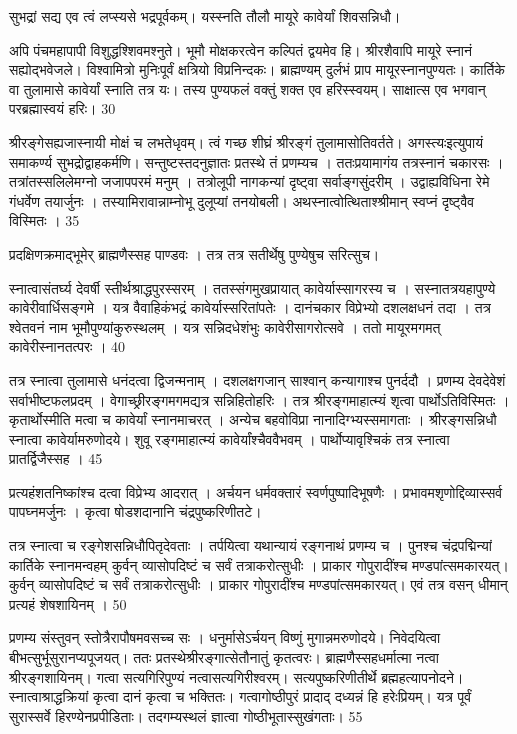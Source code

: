 सुभद्रां सद्य एव त्वं लप्स्यसे भद्रपूर्वकम्।
यस्स्नति तौलौ मायूरे कावेर्यां शिवसन्निधौ।

अपि पंचमहापापी विशुद्धश्शिवमश्नुते।
भूमौ मोक्षकरत्वेन कल्पितं द्वयमेव हि।
श्रीरशैवापि मायूरे स्नानं सह्योद्भवेजले।
विश्वामित्रो मुनिःपूर्वं क्षत्रियो विप्रनिन्दकः।
ब्राह्मण्यम् दुर्लभं प्राप मायूरस्नानपुण्यतः।
कार्तिके वा तुलामासे कावेर्यां स्नाति तत्र यः।
तस्य पुण्यफलं वक्तुं शक्त एव हरिस्स्वयम्।
साक्षात्स एव भगवान् परब्रह्मास्वयं हरिः।
30

श्रीरङ्गेसह्यजास्नायी मोक्षं च लभतेधृवम्।
त्वं गच्छ शीघ्रं श्रीरङ्गं तुलामासोतिवर्तते।
अगस्त्यःइत्युपायं समाकर्ण्य सुभद्रोद्वाहकर्मणि।
सन्तुष्टस्तदनुज्ञातः प्रतस्थे तं प्रणम्यच ।
ततःप्रयामागंय तत्रस्नानं चकारसः ।
तत्रांतस्सलिलेमग्नो जजापपरमं मनुम् ।
तत्रोलूपी नागकन्यां दृष्ट्वा सर्वाङ्गसुंदरीम् ।
उद्वाह्यविधिना रेमे गंधर्वेण तयार्जुनः ।
तस्यामिरावान्नाम्नोभू दुलूप्यां तनयोबली।
अथस्नात्वोत्थिताश्श्रीमान् स्वप्नं दृष्ट्वैव विस्मितः ।
35

प्रदक्षिणक्रमाद्भूमेर् ब्राह्मणैस्सह पाण्डवः ।
तत्र तत्र सतीर्थेषु पुण्येषुच सरित्सुच।

स्नात्वासंतर्घ्य देवर्षी स्तीर्थश्राद्धपुरस्सरम् ।
ततस्संगमुखप्रायात् कावेर्यास्सागरस्य च ।
सस्नातत्रयहापुण्ये कावेरीवार्धिसङ्गमे ।
यत्र वैवाहिकंभद्रं कावेर्यास्सरितांपतेः ।
दानंचकार विप्रेभ्यो दशलक्षधनं तदा ।
तत्र श्वेतवनं नाम भूमौपुण्यांकुरुस्थलम् ।
यत्र सन्निदधेशंभुः कावेरीसागरोत्सवे ।
ततो मायूरमगमत् कावेरीस्नानतत्परः ।
40

तत्र स्नात्वा तुलामासे धनंदत्वा द्विजन्मनाम् ।
दशलक्षगजान् साश्वान् कन्यागाश्च पुनर्ददौ ।
प्रणम्य देवदेवेशं सर्वाभीष्टफलप्रदम् ।
वेगाच्छ्रीरङ्गमगमद्यत्र सन्निहितोहरिः ।
तत्र श्रीरङ्गमाहात्म्यं शृत्वा पार्थोऽतिविस्मितः ।
कृतार्थोस्मीति मत्वा च कावेर्यां स्नानमाचरत् ।
अन्येच बहवोविप्रा नानादिग्भ्यस्समागताः ।
श्रीरङ्गसन्निधौ स्नात्वा कावेर्यामरुणोदये।
शुवू रङ्गमाहात्म्यं कावेर्यांश्चैववैभवम् ।
पार्थोप्यावृश्चिकं तत्र स्नात्वा प्रातर्द्विजैस्सह ।
45

प्रत्यहंशतनिष्कांश्च दत्वा विप्रेभ्य आदरात् ।
अर्चयन धर्मवक्तारं स्वर्णपुष्पादिभूषणैः ।
प्रभावमशृणोद्दिव्यास्सर्व पापघ्नमर्जुनः ।
कृत्वा षोडशदानानि चंद्रपुष्करिणीतटे।

तत्र स्नात्वा च रङ्गेशसन्निधौपितृदेवताः ।
तर्पयित्वा यथान्यायं रङ्गनाथं प्रणम्य च ।
पुनश्च चंद्रपद्मिन्यां कार्तिके स्नानमन्वहम् कुर्वन् व्यासोपदिष्टं च सर्वं तत्राकरोत्सुधीः ।
प्राकार गोपुरादींश्च मण्डपांत्समकारयत्।
कुर्वन् व्यासोपदिष्टं च सर्वं तत्राकरोत्सुधीः ।
प्राकार गोपुरादींश्च मण्डपांत्समकारयत्।
एवं तत्र वसन् धीमान् प्रत्यहं शेषशायिनम् ।
50

प्रणम्य संस्तुवन् स्तोत्रैरापौषमवसच्च सः ।
धनुर्मासेऽर्चयन् विष्णुं मुगान्नमरुणोदये।
निवेदयित्वा बीभत्सुर्भूसुरानप्यपूजयत्।
ततः प्रतस्थेश्रीरङ्गात्सेतौनातुं कृतत्वरः।
ब्राह्मणैस्सहधर्मात्मा नत्वा श्रीरङ्गशायिनम्।
गत्वा सत्यगिरिपुण्यं नत्वासत्यगिरीश्वरम्।
सत्यपुष्करिणीतीर्थे ब्रह्महत्यापनोदने।
स्नात्वाश्राद्धक्रियां कृत्वा दानं कृत्वा च भक्तितः।
गत्वागोष्ठीपुरं प्रादाद् दध्यन्नं हि हरेःप्रियम्।
यत्र पूर्वं सुरास्सर्वे हिरण्येनप्रपीडिताः।
तदगम्यस्थलं ज्ञात्वा गोष्ठीभूतास्सुखंगताः।
55

